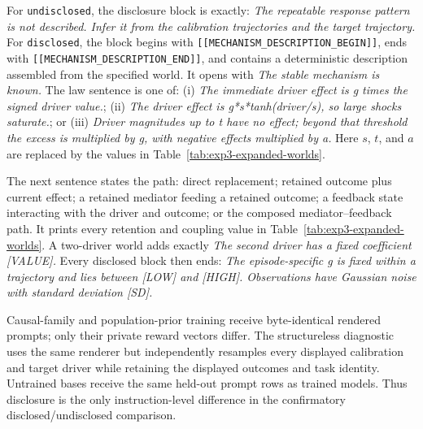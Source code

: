 For \texttt{undisclosed}, the disclosure block is exactly: \emph{The repeatable
response pattern is not described. Infer it from the calibration trajectories
and the target trajectory.} For \texttt{disclosed}, the block begins with
\texttt{[[MECHANISM\_DESCRIPTION\_BEGIN]]}, ends with
\texttt{[[MECHANISM\_DESCRIPTION\_END]]}, and contains a deterministic
description assembled from the specified world. It opens with \emph{The stable
mechanism is known.} The law sentence is one of: (i) \emph{The immediate driver
effect is g times the signed driver value.}; (ii) \emph{The driver effect is
g*s*tanh(driver/s), so large shocks saturate.}; or (iii) \emph{Driver magnitudes
up to t have no effect; beyond that threshold the excess is multiplied by g,
with negative effects multiplied by a.} Here $s$, $t$, and $a$ are replaced by
the values in Table~\ref{tab:exp3-expanded-worlds}.

The next sentence states the path: direct replacement; retained
outcome plus current effect; a retained mediator feeding a retained outcome; a
feedback state interacting with the driver and outcome; or the composed
mediator--feedback path. It prints every retention and coupling value in
Table~\ref{tab:exp3-expanded-worlds}. A two-driver world adds exactly
\emph{The second driver has a fixed coefficient [VALUE].} Every disclosed block
then ends: \emph{The episode-specific g is fixed within a trajectory and lies
between [LOW] and [HIGH]. Observations have Gaussian noise with standard
deviation [SD].}

Causal-family and population-prior training receive byte-identical rendered
prompts; only their private reward vectors differ. The structureless diagnostic
uses the same renderer but independently resamples every displayed calibration
and target driver while retaining the displayed outcomes and task identity.
Untrained bases receive the same held-out prompt rows as trained models. Thus
disclosure is the only instruction-level difference in the confirmatory
disclosed/undisclosed comparison.

